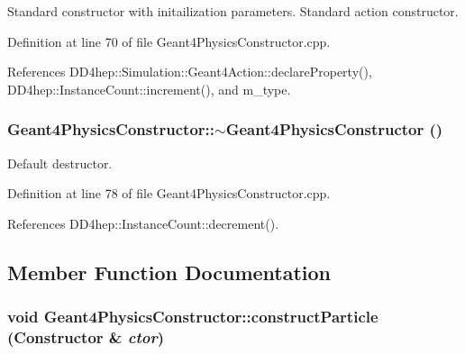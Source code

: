 Standard constructor with initailization parameters. Standard action constructor. 

Definition at line 70 of file Geant4PhysicsConstructor.cpp.

References DD4hep::Simulation::Geant4Action::declareProperty(), DD4hep::InstanceCount::increment(), and m\_\-type.\hypertarget{class_d_d4hep_1_1_simulation_1_1_geant4_physics_constructor_af600587461631109af619f9f2b252653}{
\subsubsection[{$\sim$Geant4PhysicsConstructor}]{\setlength{\rightskip}{0pt plus 5cm}Geant4PhysicsConstructor::$\sim$Geant4PhysicsConstructor ()}}
\label{class_d_d4hep_1_1_simulation_1_1_geant4_physics_constructor_af600587461631109af619f9f2b252653}


Default destructor. 

Definition at line 78 of file Geant4PhysicsConstructor.cpp.

References DD4hep::InstanceCount::decrement().

\subsection{Member Function Documentation}
\hypertarget{class_d_d4hep_1_1_simulation_1_1_geant4_physics_constructor_a2568ea7c84c0514818e665c409efa304}{
\subsubsection[{constructParticle}]{\setlength{\rightskip}{0pt plus 5cm}void Geant4PhysicsConstructor::constructParticle ({\bf Constructor} \& {\em ctor})}}
\label{class_d_d4hep_1_1_simulation_1_1_geant4_physics_constructor_a2568ea7c84c0514818e665c409efa304}


